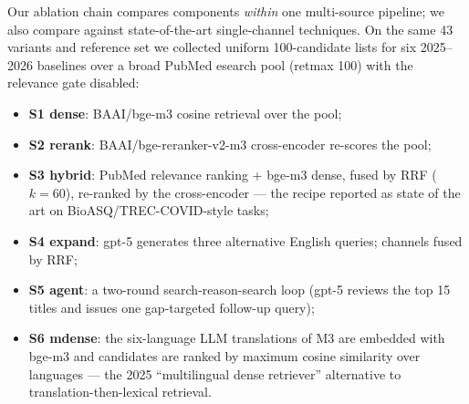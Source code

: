 \documentclass[sigconf,screen]{acmart}
\begin{document}
Our ablation chain compares components \emph{within} one multi-source
pipeline; we also compare against state-of-the-art single-channel
techniques. On the same 43 variants and reference set we collected uniform
100-candidate lists for six 2025--2026 baselines over a broad PubMed
esearch pool (retmax 100) with the relevance gate disabled:

\begin{itemize}
\item \textbf{S1 dense}: BAAI/bge-m3 cosine retrieval over the pool;
\item \textbf{S2 rerank}: BAAI/bge-reranker-v2-m3 cross-encoder re-scores
the pool;
\item \textbf{S3 hybrid}: PubMed relevance ranking + bge-m3 dense, fused
by RRF ($k{=}60$), re-ranked by the cross-encoder --- the recipe reported
as state of the art on BioASQ/TREC-COVID-style tasks;
\item \textbf{S4 expand}: gpt-5 generates three alternative English
queries; channels fused by RRF;
\item \textbf{S5 agent}: a two-round search-reason-search loop (gpt-5
reviews the top 15 titles and issues one gap-targeted follow-up query);
\item \textbf{S6 mdense}: the six-language LLM translations of M3 are
embedded with bge-m3 and candidates are ranked by maximum cosine
similarity over languages --- the 2025 ``multilingual dense retriever''
alternative to translation-then-lexical retrieval.
\end{itemize}
\end{document}
